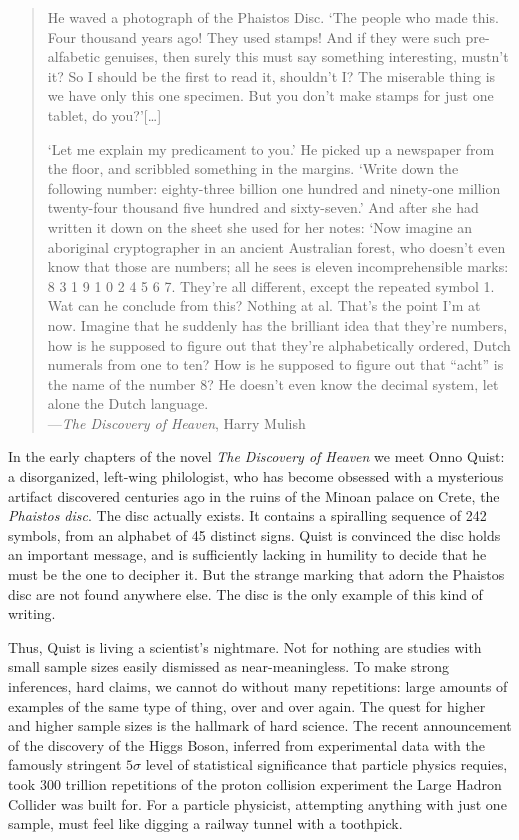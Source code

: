 \begin{quote}
He waved a photograph of the Phaistos Disc. `The people who made this. Four thousand years ago! They used stamps! And if they were such pre-alfabetic genuises, then surely this must say something interesting, mustn't it? So I should be the first to read it, shouldn't I? The miserable thing is we have only this one specimen. But you don't make stamps for just one tablet, do you?'[\ldots]

`Let me explain my predicament to you.' He picked up a newspaper from the floor, and scribbled something in the margins.
`Write down the following number: eighty-three billion one hundred and ninety-one million twenty-four thousand five hundred and sixty-seven.' And after she had written it down on the sheet she used for her notes: `Now imagine an aboriginal cryptographer in an ancient Australian forest, who doesn't even know that those are numbers; all he sees is eleven incomprehensible marks: 8 3 1 9 1 0 2 4 5 6 7. They're all different, except the repeated symbol 1. Wat can he conclude from this? Nothing at al. That's the point I'm at now. Imagine that he suddenly has the brilliant idea that they're numbers, how is he supposed to figure out that they're alphabetically ordered, Dutch numerals from one to ten? How is he supposed to figure out that ``acht'' is the name of the number 8? He doesn't even know the decimal system, let alone the Dutch language.\\
---\emph{The Discovery of Heaven}, Harry Mulish \cite{mulisch1996discovery} 
\end{quote}


In the early chapters of the novel \emph{The Discovery of Heaven} we meet Onno Quist: a disorganized, left-wing philologist, who has become obsessed with a mysterious artifact discovered centuries ago in the ruins of the Minoan palace on Crete, the \emph{Phaistos disc}. The disc actually exists. It contains a spiralling sequence of 242 symbols, from an alphabet of 45 distinct signs. Quist is convinced the disc holds an important message, and is sufficiently lacking in humility to decide that he must be the one to decipher it. But the strange marking that adorn the Phaistos disc are not found anywhere else. The disc is the only example of this kind of writing.

  

Thus, Quist is living a scientist's nightmare. Not for nothing are studies with small sample sizes easily dismissed as near-meaningless. To make strong inferences, hard claims, we cannot do without many repetitions: large amounts of examples of the same type of thing, over and over again. The quest for higher and higher sample sizes is the hallmark of hard science. The recent announcement of the discovery of the Higgs Boson, inferred from experimental data with the famously stringent $5\sigma$ level of statistical significance that particle physics requies, took 300 trillion repetitions of the proton collision experiment the Large Hadron Collider was built for. For a particle physicist, attempting anything with just one sample, must feel like digging a railway tunnel with a toothpick.


